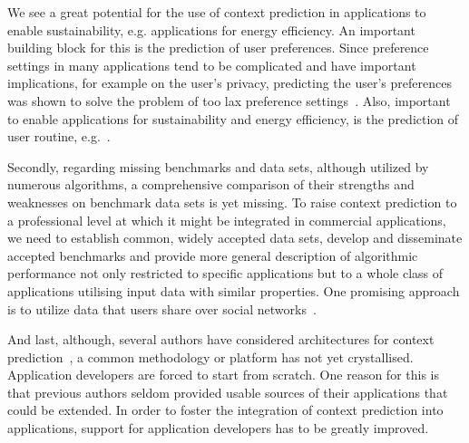 We see a great potential for the use of context prediction in applications to enable sustainability, e.g. applications for energy efficiency. 
An important building block for this is the prediction of user preferences. 
Since preference settings in many applications tend to be complicated and have important implications, for example on the user's privacy, predicting the user's preferences was shown to solve the problem of too lax preference settings~\cite{Prediction_Bigwood_2012}. 
Also, important to enable applications for sustainability and energy efficiency, is the prediction of user routine, e.g.~\cite{Prediction_Seiter_2012}.    

Secondly, regarding missing benchmarks and data sets, although utilized by numerous algorithms, a comprehensive comparison of their strengths and weaknesses on benchmark data sets is yet missing. 
To raise context prediction to a professional level at which it might be integrated in commercial applications, we need to establish common, widely accepted data sets, develop and disseminate accepted benchmarks and provide more general description of algorithmic performance not only restricted to specific applications but to a whole class of applications utilising input data with similar properties. 
One promising approach is to utilize data that users share over social networks~\cite{Prediction_Zhang_2012}.

And last, although, several authors have considered architectures for context prediction~\cite{5001,4027,5010}, a common methodology or platform has not yet crystallised. 
Application developers are forced to start from scratch. One reason for this is that previous authors seldom provided usable sources of their applications that could be extended. 
In order to foster the integration of context prediction into applications, support for application developers has to be greatly improved. 

\cite{Prediction_Kasteren_2008,Prediction_Tenorth_2009}